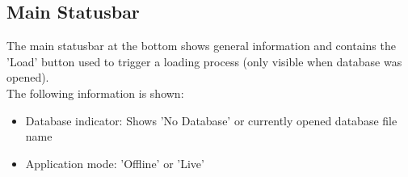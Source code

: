 


\subsection{Main Statusbar}

The main statusbar at the bottom shows general information and contains the 'Load' button used to trigger a loading process (only visible when database was opened). \\

The following information is shown:

\begin{itemize}
 \item Database indicator: Shows 'No Database' or currently opened database file name
 \item Application mode: 'Offline' or 'Live'
\end{itemize}
\  \\






